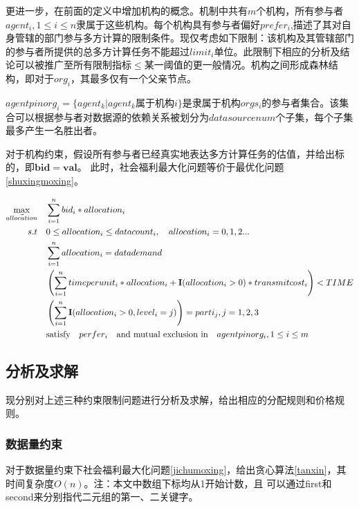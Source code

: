 \documentclass[promaster]{thesis-uestc}
\begin{document}
更进一步，在前面的定义中增加机构的概念。机制中共有$m$个机构，所有参与者$agent_i,1 \leq i \leq n$隶属于这些机构。每个机构具有参与者偏好$prefer_i$,描述了其对自身管辖的部门参与多方计算的限制条件。现仅考虑如下限制：该机构及其管辖部门的参与者所提供的总多方计算任务不能超过$limit_i$单位。此限制下相应的分析及结论可以被推广至所有限制指标$\leq$某一阈值的更一般情况。机构之间形成森林结构，即对于$org_i$，其最多仅有一个父亲节点。

$agentpinorg_i=\{agent_k|agent_k属于机构i\}$是隶属于机构$orgs_i$的参与者集合。该集合可以根据参与者对数据源的依赖关系被划分为$datasourcenum$个子集，每个子集最多产生一名胜出者。

对于机构约束，假设所有参与者已经真实地表达多方计算任务的估值，并给出标的，即$\mathbf{bid} = \mathbf{val}$。 此时，社会福利最大化问题等价于最优化问题\ref{shuxingmoxing}。

\begin{align}
    \label{shuxingmoxing}\max_{\vec{allocation}} \quad&\sum_{i=1}^{n}{bid_i*allocation_i}\\
    s.t\quad& 0\leq allocation_i\leq datacount_i,\quad allocation_i = {0,1,2...}\notag\\
        \quad& \sum_{i=1}^{n}{allocation_i} = datademand\notag\\
        \quad& \left(\sum_{i=1}^{n}{timeperunit_i*allocation_i+\mathbf{I}(allocation_i > 0)*transmitcost_i}\right) < TIME\notag\\
        \quad& \left(\sum_{i=1}^{n}{\mathbf{I}(allocation_i > 0,level_i = j)}\right)=parti_j, j = {1,2,3}\notag\\
        \quad& \text{satisfy}\quad perfer_i \quad \text{and mutual exclusion in}\quad agentpinorg_i, 1\leq i\leq m \notag
\end{align}

\FloatBarrier

\subsection{分析及求解}
现分别对上述三种约束限制问题进行分析及求解，给出相应的分配规则和价格规则。

\subsubsection{数据量约束}

对于数据量约束下社会福利最大化问题\ref{jichumoxing}，给出贪心算法\ref{tanxin}，其时间复杂度$O(n)$。注：本文中数组下标均从1开始计数，且
可以通过first和second来分别指代二元组的第一、二关键字。
\end{document}
